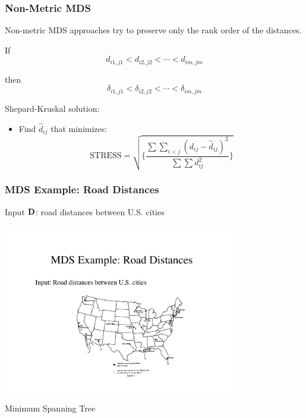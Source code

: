 \documentclass{beamer}
\begin{document}
\begin{frame}
  \frametitle{Non-Metric MDS}

Non-metric MDS approaches try to preserve only the rank order of the distances.

If
\[
d_{i1,j1} < d_{i2,j2} < \cdots< d_{im,jm}
\]

then
\[
\delta_{i1,j1} < \delta_{i2,j2} < \cdots< \delta_{im,jm}
\]

Shepard-Kruskal solution:

\begin{itemize}
\item Find $\hat{d}_{ij}$ that minimizes:
\[
\mbox{STRESS} = \sqrt{ \{ \frac{\sum \sum_{i < j}(d_{ij}-\hat{d}_{ij})^2 }{\sum \sum d_{ij}^2} \} }
\]
\end{itemize}

\bigskip

\end{frame}

\begin{frame}
  \frametitle{MDS Example: Road Distances}

Input $\mathbf{D}$: road distances between U.S. cities

\begin{center}
\includegraphics[height=2.9in]{mds-road}
\end{center}

\end{frame}


\begin{frame}[plain,c]
\begin{center}
\Huge Minimum Spanning Tree
\end{center}
\end{frame}
\end{document}
